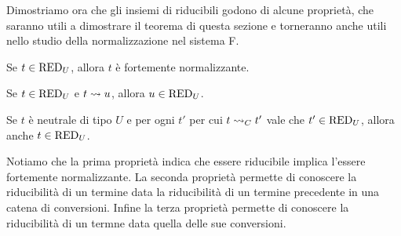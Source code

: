 \documentclass[]{marticle}
\begin{document}
Dimostriamo ora che gli insiemi di riducibili godono di alcune propriet\`a, che
saranno utili a dimostrare il teorema di questa sezione e torneranno anche utili
nello studio della normalizzazione nel sistema F.

\begin{block}[Proposizione]
    \begin{nlist}[CR1]
        \item Se $t\in \text{RED}_{U}$, allora $t$ \`e fortemente normalizzante.
        \item Se $t\in \text{RED}_{U}$ e $t\rightsquigarrow u$, allora $u\in\text{RED}_{U}$.
        \item Se $t$ \`e neutrale di tipo $U$ e per ogni $t'$ per cui $t\rightsquigarrow_C
            t'$ vale che $t'\in\text{RED}_{U}$, allora anche $t\in\text{RED}_{U}$.
    \end{nlist}
\end{block}

Notiamo che la prima propriet\`a indica che essere riducibile implica l'essere
fortemente normalizzante. La seconda propriet\`a permette di conoscere la
riducibilit\`a di un termine data la riducibilit\`a di un termine precedente in
una catena di conversioni. Infine la terza propriet\`a permette di conoscere la
riducibilit\`a di un termne data quella delle sue conversioni.
\end{document}
